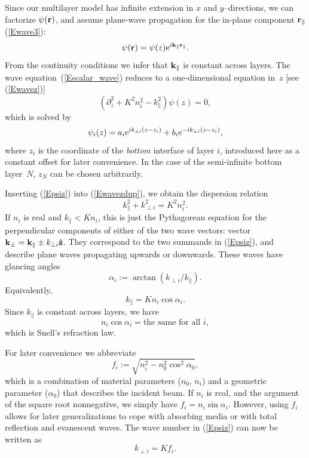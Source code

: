 Since our multilayer model has infinite extension
in $x$ and $y$--directions, we can factorize
$\psi(\mathbf{r})$, and assume plane-wave propagation for
the in-plane component $\mathbf{r}_\parallel$ (\ref{Ewave3}):
\begin{equation}\label{Ewave3dup}
\psi(\mathbf{r}) = \psi(z) \text{e}^{i \mathbf{k}_\parallel\mathbf{r}_\parallel}.
\end{equation}
From the continuity conditions we infer that $\mathbf{k}_\parallel$
is constant across layers.
The wave equation~(\ref{Escalar_wave})
reduces to a one-dimensional equation in~$z$ [see (\ref{Ewavez})]
\begin{equation}\label{Ewavezdup}
\left(\partial_z^2 + K^2n_i^2 - k_\parallel^2 \right) \psi(z) = 0,
\end{equation}
which is solved by
\begin{equation}\label{Epsiz}
  \psi_i(z) = a_i\text{e}^{ik_{\perp i}(z-z_i)} + b_i\text{e}^{-ik_{\perp i}(z-z_i)},
\end{equation}
where $z_i$ is the coordinate of the \textit{bottom} interface
of layer $i$,
introduced here as a constant offset for later convenience.
In the case of the semi-infinite bottom layer~$N$,
$z_N$ can be chosen arbitrarily.

Inserting (\ref{Epsiz}) into (\ref{Ewavezdup}),
we obtain the dispersion relation
\begin{equation}\label{Edisp}
  k_\parallel^2 + k_{\perp i}^2 = K^2 n_i^2.   
\end{equation}
If $n_i$ is real and $k_\parallel<K n_i$,
this is just the Pythagorean equation
for the perpendicular components of either of
the two wave vectors:
vector $\mathbf{k}_\pm=\mathbf{k}_\parallel \pm k_{\perp i}\mathbf{\hat z}$.
They correspond to the two summands in (\ref{Epsiz}),
and describe plane waves propagating upwards or downwards.
These waves have glancing angles
\begin{equation}\label{Edef_alpha}
  \alpha_i:=\arctan(k_{\perp i}/k_\parallel).  
\end{equation}
Equivalently,
\begin{equation}
  k_\parallel=K n_i \cos\alpha_i. 
\end{equation}
Since $k_\parallel$ is constant across layers,
we have
\begin{equation}\label{ESnell}
  n_i \cos\alpha_i = \text{the same for all }i,
\end{equation}
which is Snell's refraction law.

For later convenience we abbreviate
\begin{equation}\label{Edef_f}
f_i := \sqrt{ n_i^2 - n_0^2 \cos^2\alpha_0 },
\end{equation}
which is a combination of material parameters ($n_0$, $n_i$)
and a geometric parameter ($\alpha_0$) that describes the incident beam.
If $n_i$ is real, and the argument of the square root nonnegative,
we simply have $f_i=n_i\sin\alpha_i$.
However, using $f_i$ allows for later generalizations
to cope with absorbing media or with total reflection and evanescent waves.
The wave number in (\ref{Epsiz}) can now be written as
\begin{equation}\label{EkKf}
  k_{\perp i} = K f_i.
\end{equation}


